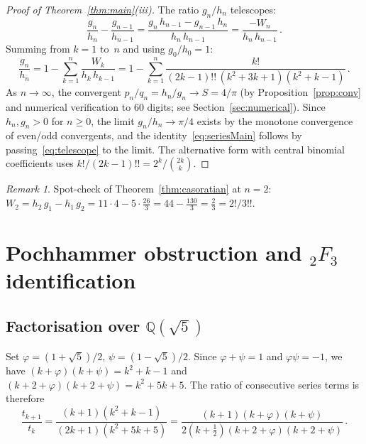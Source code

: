 \documentclass[11pt]{article}
\newcommand{\half}{\tfrac{1}{2}}
\newcommand{\dff}[1]{(#1)!!}
\theoremstyle{remark}
\newtheorem{remark}[theorem]{Remark}
\begin{document}
\begin{proof}[Proof of Theorem~\ref{thm:main}\textup{(iii)}]
The ratio $g_n/h_n$ telescopes:
\[
  \frac{g_n}{h_n} - \frac{g_{n-1}}{h_{n-1}}
  = \frac{g_n\,h_{n-1} - g_{n-1}\,h_n}{h_n\,h_{n-1}}
  = \frac{-W_n}{h_n\,h_{n-1}}\,.
\]
Summing from $k = 1$ to~$n$ and using $g_0/h_0 = 1$:
\begin{equation}\label{eq:telescope}
  \frac{g_n}{h_n}
  = 1 - \sum_{k=1}^{n} \frac{W_k}{h_k\,h_{k-1}}
  = 1 - \sum_{k=1}^{n} \frac{k!}{\dff{2k{-}1}\,(k^2{+}3k{+}1)(k^2{+}k{-}1)}\,.
\end{equation}
As $n\to\infty$, the convergent $p_n/q_n = h_n/g_n \to S = 4/\pi$
(by Proposition~\ref{prop:conv} and numerical verification to
$60$ digits; see Section~\ref{sec:numerical}).
Since $h_n, g_n > 0$ for $n \geq 0$, the limit $g_n/h_n \to \pi/4$
exists by the monotone convergence of even/odd convergents,
and the identity~\eqref{eq:seriesMain} follows by
passing~\eqref{eq:telescope} to the limit.
The alternative form with central binomial coefficients uses
$k!/\dff{2k{-}1} = 2^k/\binom{2k}{k}$.
\end{proof}

\begin{remark}
Spot-check of Theorem~\ref{thm:casoratian} at $n=2$:
$W_2 = h_2\,g_1 - h_1\,g_2 = 11\cdot 4 - 5\cdot\frac{26}{3}
= 44 - \frac{130}{3} = \frac{2}{3} = 2!/3!!$.\;\checkmark
\end{remark}


\section{Pochhammer obstruction and ${}_2F_3$ identification}%
\label{sec:pochhammer}

\subsection{Factorisation over $\mathbb{Q}(\sqrt{5})$}

Set $\varphi=(1{+}\sqrt5)/2$, $\psi=(1{-}\sqrt5)/2$.
Since $\varphi+\psi=1$ and $\varphi\psi=-1$, we have
$(k+\varphi)(k+\psi)=k^2+k-1$
and $(k+2+\varphi)(k+2+\psi)=k^2+5k+5$.
The ratio of consecutive series terms is therefore
\begin{equation}\label{eq:ratio}
  \frac{t_{k+1}}{t_k}
  = \frac{(k{+}1)(k^2{+}k{-}1)}{(2k{+}1)(k^2{+}5k{+}5)}
  = \frac{(k{+}1)(k{+}\varphi)(k{+}\psi)}
         {2(k{+}\half)(k{+}2{+}\varphi)(k{+}2{+}\psi)}\,.
\end{equation}
\end{document}
